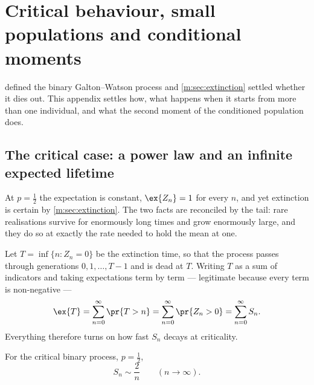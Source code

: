 \renewcommand{\thesection}{\thechapter.\Alph{section}}
\setcounter{section}{0}

\section{Critical behaviour, small populations and conditional moments}
\label{m:app:criticalgw}

 defined the binary Galton--Watson process and
\cref{m:sec:extinction} settled whether it dies out. This appendix settles how, what
happens when it starts from more than one individual, and what the second moment of
the conditioned population does.

\subsection{The critical case: a power law and an infinite expected lifetime}
\label{m:app:critical}

At $p=\tfrac12$ the expectation is constant, $\ex{Z_n}=1$ for every $n$, and yet
extinction is certain by \cref{m:sec:extinction}. The two facts are reconciled by
the tail: rare realisations survive for enormously long times and grow enormously
large, and they do so at exactly the rate needed to hold the mean at one.

Let $T=\inf\{n:Z_n=0\}$ be the extinction time, so that the process passes through
generations $0,1,\dots,T-1$ and is dead at $T$. Writing $T$ as a sum of indicators
and taking expectations term by term --- legitimate because every term is
non-negative ---
\begin{equation}
\label{m:eq:ETsumSn}
\ex{T} = \sum_{n=0}^{\infty}\pr{T>n} = \sum_{n=0}^{\infty}\pr{Z_n>0}
= \sum_{n=0}^{\infty}S_n .
\end{equation}
Everything therefore turns on how fast $S_n$ decays at criticality.

\begin{proposition}
\label{m:prop:criticalSn}
For the critical binary process, $p=\tfrac12$,
\begin{equation}
\label{m:eq:twoovern}
S_n\sim\frac{2}{n}\qquad(n\to\infty).
\end{equation}
\end{proposition}

